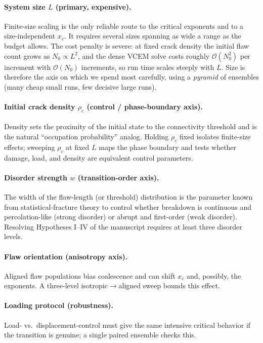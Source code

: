 \documentclass[11pt]{article}
\newcommand{\xc}{x_c}
\newcommand{\rhoc}{\rho_c}
\begin{document}
\paragraph{System size $L$ (primary, expensive).}
Finite-size scaling is the only reliable route to the critical exponents and to a
size-independent $\xc$. It requires several sizes spanning as wide a range as the
budget allows. The cost penalty is severe: at fixed crack density the initial flaw
count grows as $N_0 \propto L^2$, and the dense VCEM solve costs roughly
$\mathcal{O}(N_0^2)$ per increment with $\mathcal{O}(N_0)$ increments, so run time
scales steeply with $L$. Size is therefore the axis on which we spend most carefully,
using a \emph{pyramid} of ensembles (many cheap small runs, few decisive large runs).

\paragraph{Initial crack density $\rhoc$ (control / phase-boundary axis).}
Density sets the proximity of the initial state to the connectivity threshold and is
the natural ``occupation probability'' analog. Holding $\rhoc$ fixed isolates
finite-size effects; sweeping $\rhoc$ at fixed $L$ maps the phase boundary and tests
whether damage, load, and density are equivalent control parameters.

\paragraph{Disorder strength $w$ (transition-order axis).}
The width of the flaw-length (or threshold) distribution is the parameter known from
statistical-fracture theory to control whether breakdown is continuous and
percolation-like (strong disorder) or abrupt and first-order (weak disorder).
Resolving Hypotheses I--IV of the manuscript requires at least three disorder levels.

\paragraph{Flaw orientation (anisotropy axis).}
Aligned flaw populations bias coalescence and can shift $\xc$ and, possibly, the
exponents. A three-level isotropic$\rightarrow$aligned sweep bounds this effect.

\paragraph{Loading protocol (robustness).}
Load- vs.\ displacement-control must give the same intensive critical behavior if the
transition is genuine; a single paired ensemble checks this.
\end{document}
